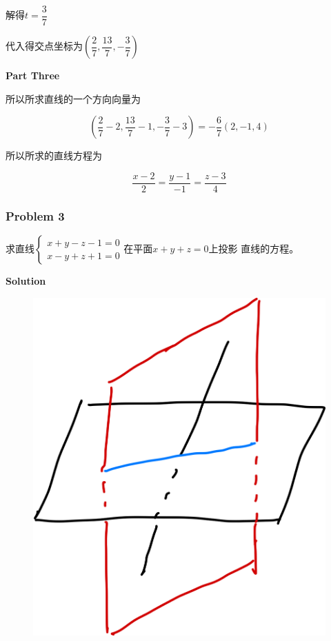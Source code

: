 \documentclass[
	11pt, %
	a4paper, %
]{WhuSakuraBook}
\begin{document}
    解得\(t=\dfrac{3}{7}\)

    代入得交点坐标为$\left(\dfrac{2}{7}, \dfrac{13}{7},-\dfrac{3}{7}\right)$

    \textbf{Part Three}

    所以所求直线的一个方向向量为

    $$
        \left(\frac{2}{7}-2, \frac{13}{7}-1,-\frac{3}{7}-3\right)=-\frac{6}{7}(2,-1,4)
    $$

    所以所求的直线方程为

    $$
        \frac{x-2}{2}=\frac{y-1}{-1}=\frac{z-3}{4}
    $$

\subsubsection{Problem 3}

    求直线$\left\{\begin{array}{l}x+y-z-1=0 \\ x-y+z+1=0\end{array}\right.$在平面\(x+y+z=0\)上投影
    直线的方程。
    \vspace{1em}

    \textbf{Solution}
    \vspace{1em}

    \begin{figure}
        \centering
        \includegraphics[scale=0.08]{"Chapter 08 images/pic2.png"}
        \label{pic2}
    \end{figure}
\end{document}
